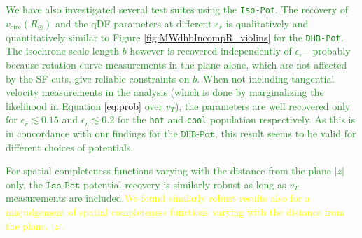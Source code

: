 \documentclass[iop,revtex4,numberedappendix,appendixfloats]{emulateapj}
\newcommand{\NEW}[1]{\textcolor{ForestGreen}{#1}}
\newcommand{\OLD}[1]{\textcolor{Yellow}{#1}}%
\begin{document}
\NEW{We have also investigated several test suites using the \texttt{Iso-Pot}. The recovery of $v_\text{circ}(R_\odot)$ and the qDF parameters at different $\epsilon_r$ is qualitatively and quantitatively similar to Figure \ref{fig:MWdhbIncompR_violins} for the \texttt{DHB-Pot}. The isochrone scale length $b$ however is recovered independently of $\epsilon_r$---probably because rotation curve measurements in the plane alone, which are not affected by the SF cuts, give reliable constraints on $b$. When not including tangential velocity measurements in the analysis (which is done by marginalizing the likelihood in Equation \eqref{eq:prob} over $v_T$), the parameters are well recovered only for $\epsilon_r \lesssim 0.15$ and $\epsilon_r \lesssim 0.2$ for the \texttt{hot} and \texttt{cool} population respectively. As this is in concordance with our findings for the $\texttt{DHB-Pot}$, this result seems to be valid for different choices of potentials.}

\NEW{For spatial completeness functions varying with the distance from the plane $|z|$ only, the $\texttt{Iso-Pot}$ potential recovery is similarly robust as long as $v_T$ measurements are included.}\OLD{We found similarly robust results also for a misjudgement of spatial completeness functions varying with the distance from the plane, $|z|$.}
\end{document}
